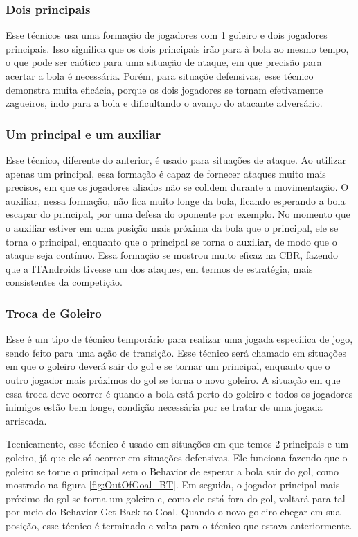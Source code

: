 \documentclass[a4paper,12pt]{article}
\begin{document}
\subsubsection{Dois principais} Esse técnicos usa uma formação de jogadores com 1 goleiro e dois jogadores principais. Isso significa que os dois principais irão para à bola ao mesmo tempo, o que pode ser caótico para uma situação de ataque, em que precisão para acertar a bola é necessária. Porém, para situaçõe defensivas, esse técnico demonstra muita eficácia, porque os dois jogadores se tornam efetivamente zagueiros, indo para a bola e dificultando o avanço do atacante adversário.

\subsubsection{Um principal e um auxiliar} Esse técnico, diferente do anterior, é usado para situações de ataque. Ao utilizar apenas um principal, essa formação é capaz de fornecer ataques muito mais precisos, em que os jogadores aliados não se colidem durante a movimentação. O auxiliar, nessa formação, não fica muito longe da bola, ficando esperando a bola escapar do principal, por uma defesa do oponente por exemplo. No momento que o auxiliar estiver em uma posição mais próxima da bola que o principal, ele se torna o principal, enquanto que o principal se torna o auxiliar, de modo que o ataque seja contínuo. Essa formação se mostrou muito eficaz na CBR, fazendo que a ITAndroids tivesse um dos ataques, em termos de estratégia, mais consistentes da competição.

\subsubsection{Troca de Goleiro} Esse é um tipo de técnico temporário para realizar uma jogada específica de jogo, sendo feito para uma ação de transição. Esse técnico será chamado em situações em que o goleiro deverá sair do gol e se tornar um principal, enquanto que o outro jogador mais próximos do gol se torna o novo goleiro. A situação em que essa troca deve ocorrer é quando a bola está perto do goleiro e todos os jogadores inimigos estão bem longe, condição necessária por se tratar de uma jogada arriscada.

Tecnicamente, esse técnico é usado em situações em que temos 2 principais e um goleiro, já que ele só ocorrer em situações defensivas. Ele funciona fazendo que o goleiro se torne o principal sem o Behavior de esperar a bola sair do gol, como mostrado na figura \ref{fig:OutOfGoal_BT}. Em seguida, o jogador principal mais próximo do gol se torna um goleiro e, como ele está fora do gol, voltará para tal por meio do Behavior Get Back to Goal. Quando o novo goleiro chegar em sua posição, esse técnico é terminado e volta para o técnico que estava anteriormente.
\end{document}
